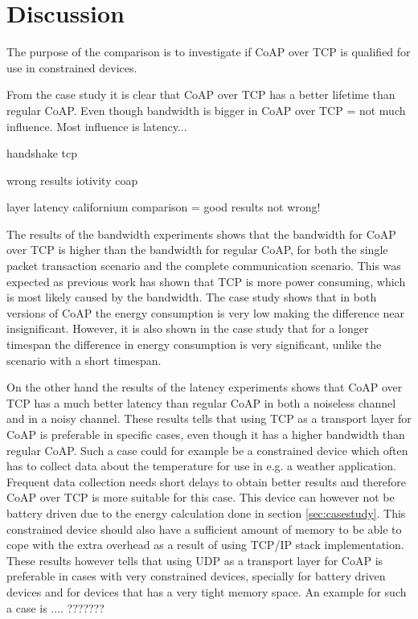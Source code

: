 \section{Discussion}\label{sec:discussion}
The purpose of the comparison is to investigate if CoAP over TCP is qualified for use in constrained devices.

From the case study it is clear that CoAP over TCP has a better lifetime than regular CoAP. 
Even though bandwidth is bigger in CoAP over TCP = not much influence.
Most influence is latency...

handshake tcp

wrong results iotivity coap

layer latency
californium comparison = good results not wrong!




 The results of the bandwidth experiments shows that the bandwidth for CoAP over TCP is higher than the bandwidth for regular CoAP, for both the single packet transaction scenario and the complete communication scenario. This was expected as previous work has shown that TCP is more power consuming, which is most likely caused by the bandwidth. The case study shows that in both versions of CoAP the energy consumption is very low making the difference near insignificant. However, it is also shown in the case study that for a longer timespan the difference in energy consumption is very significant, unlike the scenario with a short timespan. 

On the other hand the results of the latency experiments shows that CoAP over TCP has a much better latency than regular CoAP in both a noiseless channel and in a noisy channel. 
These results tells that using TCP as a transport layer for CoAP  is preferable in specific cases, even though it has a higher bandwidth than regular CoAP. 
Such a case could for example be a constrained device which often has to collect data about the temperature for use in e.g. a weather application. Frequent data collection needs short delays to obtain better results and therefore CoAP over TCP is more suitable for this case. This device can however not be battery driven due to the energy calculation done in section \ref{sec:casestudy}. This constrained device should also have a sufficient amount of memory to be able to cope with the extra overhead as a result of using TCP/IP stack implementation. 
These results however tells that using UDP as a transport layer for CoAP is preferable in cases with very constrained devices, specially for battery driven devices and for devices that has a very tight memory space. An example for such a case is .... ??????? 

